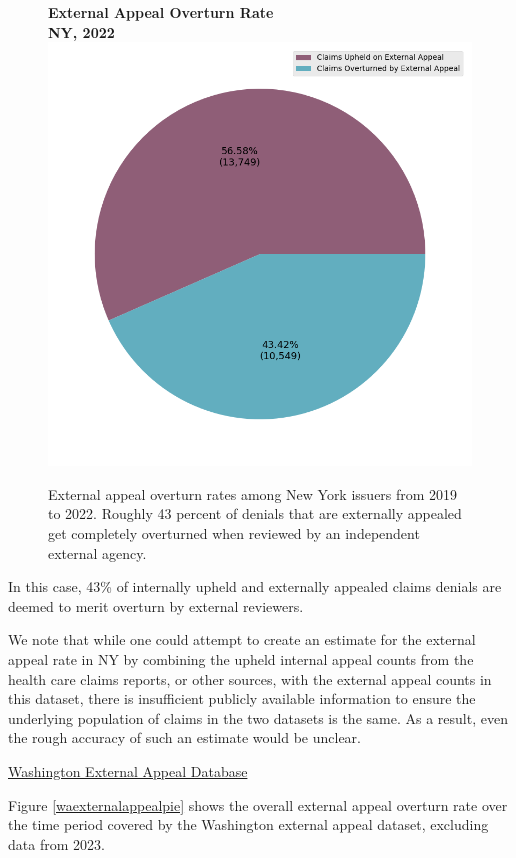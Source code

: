 \documentclass[12pt, a4paper,twoside,parskip=full]{report}
\theoremstyle{plain} %
\theoremstyle{definition} %
\theoremstyle{remark} %
\numberwithin{equation}{chapter}
\begin{document}
		
		\begin{figure}[h!]
			\centering
			\textbf{External Appeal Overturn Rate}\\
			\textbf{NY, 2022}\\
			\includegraphics[width=.4\textwidth]{images/nys_external/external_appeal_success_rates.png}
			\caption{External appeal overturn rates among New York issuers from 2019 to 2022. Roughly 43 percent of denials that are externally appealed get completely overturned when reviewed by an independent external agency.}
			\label{nyexternalappealpie}
		\end{figure}
	
		\clearpage
		
		In this case, 43\% of internally upheld and externally appealed claims denials are deemed to merit overturn by external reviewers.
		
		We note that while one could attempt to create an estimate for the external appeal rate in NY by combining the upheld internal appeal counts from the health care claims reports, or other sources, with the external appeal counts in this dataset, there is insufficient publicly available information to ensure the underlying population of claims in the two datasets is the same. As a result, even the rough accuracy of such an estimate would be unclear.
		
		\underline{Washington External Appeal Database}
		
		Figure \ref{waexternalappealpie} shows the overall external appeal overturn rate over the time period covered by the Washington external appeal dataset, excluding data from 2023.
		
\end{document}
